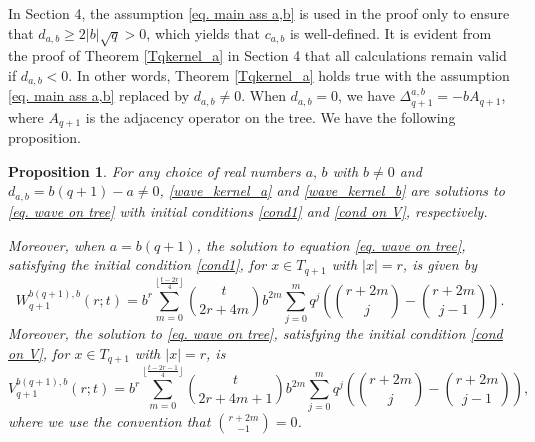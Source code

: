 \documentclass[12pt]{amsart}
\numberwithin{equation}{section}
\newtheorem{proposition}[theorem]{Proposition}
\theoremstyle{boldremark}
\begin{document}
In Section 4, the assumption \eqref{eq. main ass a,b} is used in the proof only to ensure that $d_{a,b}\geq 2|b|\sqrt{q}>0$, which yields that $c_{a,b}$ is well-defined. It is evident from the proof of Theorem \ref{Tqkernel_a} in Section 4 that all calculations remain valid if $d_{a,b}<0$. In other words, Theorem \ref{Tqkernel_a} holds true with the assumption \eqref{eq. main ass a,b} replaced by $d_{a,b}\neq 0$.  
When $d_{a,b}=0$, we have $\Delta_{q+1}^{a,b}=-bA_{{q+1}}$, where $A_{{q+1}}$ is the adjacency operator on the tree. We have the following proposition.

\begin{proposition} \label{prop. arb param} For any choice of real numbers $a,\, b$ with $b\neq 0$ and $d_{a,b}=b(q+1)-a \neq 0$,  \eqref{wave_kernel_a} and \eqref{wave_kernel_b} are solutions to \eqref{eq. wave on tree} with initial conditions \eqref{cond1} and \eqref{cond on V}, respectively. 

Moreover, when $a=b(q+1)$, the solution to equation \eqref{eq. wave on tree}, satisfying the initial condition \eqref{cond1}, for $x\in T_{q+1}$ with $|x|=r$, is given by
\begin{equation*}
W^{b(q+1),b}_{q+1}(r;t)
=
b^r\sum_{m=0}^{\lfloor\frac{t-2r}{4}\rfloor} \binom{t}{2r+4m}b^{2m}\sum_{j=0}^m q^j\left(\binom{r+2m}{j}-\binom{r+2m}{j-1}\right).
\end{equation*}
Moreover, the solution to \eqref{eq. wave on tree}, satisfying the initial condition \eqref{cond on V}, for $x\in T_{q+1}$ with $|x|=r$, is
\begin{equation*}
V^{b(q+1),b}_{q+1}(r;t)
=
b^r\sum_{m=0}^{\lfloor\frac{t-2r-1}{4}\rfloor} \binom{t}{2r+4m+1}b^{2m}\sum_{j=0}^m q^j\left(\binom{r+2m}{j}-\binom{r+2m}{j-1}\right),
\end{equation*}
where we use the convention that $\binom{r+2m}{-1}=0$.
\end{proposition}
\end{document}
